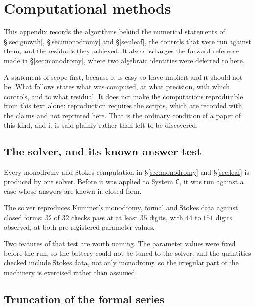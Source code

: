 \section{Computational methods}\label{app:methods}

This appendix records the algorithms behind the numerical statements of
\S\ref{sec:growth}, \S\ref{sec:monodromy} and \S\ref{sec:leaf}, the controls
that were run against them, and the residuals they achieved. It also discharges
the forward reference made in \S\ref{sec:monodromy}, where two algebraic
identities were deferred to here.

A statement of scope first, because it is easy to leave implicit and it should
not be. What follows states what was computed, at what precision, with which
controls, and to what residual. It does not make the computations
reproducible from this text alone: reproduction requires the scripts, which are
recorded with the claims and not reprinted here. That is the ordinary condition
of a paper of this kind, and it is said plainly rather than left to be
discovered.

\subsection{The solver, and its known-answer test}\label{ssec:methods-solver}

Every monodromy and Stokes computation in \S\ref{sec:monodromy} and
\S\ref{sec:leaf} is produced by one solver. Before it was applied to System
$\mathsf C$, it was run against a case whose answers are known in closed form.

\begin{remark}
The solver reproduces Kummer's monodromy, formal and Stokes data against closed
forms: $32$ of $32$ checks pass at at least $35$ digits, with $44$ to $151$
digits observed, at both pre-registered parameter values.
\end{remark}

Two features of that test are worth naming. The parameter values were fixed
before the run, so the battery could not be tuned to the solver; and the
quantities checked include Stokes data, not only monodromy, so the irregular
part of the machinery is exercised rather than assumed.

\subsection{Truncation of the formal series}\label{ssec:methods-truncation}

